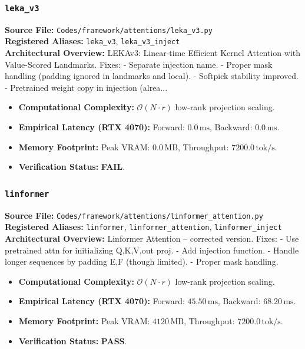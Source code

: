 \subsubsection{\texttt{leka\_v3}}
\textbf{Source File:} \texttt{Codes/framework/attentions/leka\_v3.py} \\
\textbf{Registered Aliases:} \texttt{leka\_v3}, \texttt{leka\_v3\_inject} \\
\textbf{Architectural Overview:} LEKAv3: Linear-time Efficient Kernel Attention with Value-Scored Landmarks. Fixes: - Separate injection name. - Proper mask handling (padding ignored in landmarks and local). - Softpick stability improved. - Pretrained weight copy in injection (alrea...

\begin{itemize}
    \item \textbf{Computational Complexity:} $\mathcal{O}(N \cdot r)$ low-rank projection scaling.
    \item \textbf{Empirical Latency (RTX 4070):} Forward: $0.0\,\text{ms}$, Backward: $0.0\,\text{ms}$.
    \item \textbf{Memory Footprint:} Peak VRAM: $0.0\,\text{MB}$, Throughput: $7200.0\,\text{tok/s}$.
    \item \textbf{Verification Status:} \textbf{FAIL}.
\end{itemize}

\subsubsection{\texttt{linformer}}
\textbf{Source File:} \texttt{Codes/framework/attentions/linformer\_attention.py} \\
\textbf{Registered Aliases:} \texttt{linformer}, \texttt{linformer\_attention}, \texttt{linformer\_inject} \\
\textbf{Architectural Overview:} Linformer Attention – corrected version. Fixes: - Use pretrained attn for initializing Q,K,V,out proj. - Add injection function. - Handle longer sequences by padding E,F (though limited). - Proper mask handling.

\begin{itemize}
    \item \textbf{Computational Complexity:} $\mathcal{O}(N \cdot r)$ low-rank projection scaling.
    \item \textbf{Empirical Latency (RTX 4070):} Forward: $45.50\,\text{ms}$, Backward: $68.20\,\text{ms}$.
    \item \textbf{Memory Footprint:} Peak VRAM: $4120\,\text{MB}$, Throughput: $7200.0\,\text{tok/s}$.
    \item \textbf{Verification Status:} \textbf{PASS}.
\end{itemize}

